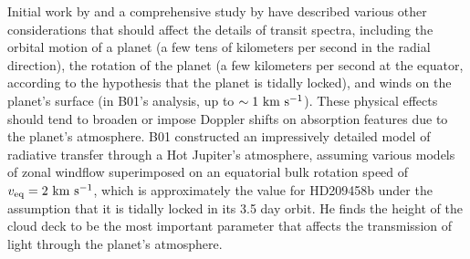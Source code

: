\documentclass[12pt,preprint]{aastex}
\begin{document}
Initial work by \citet{seager+sasselov2000} and a comprehensive study by
\citet[hereafter B01]{brown2001}
have described various other considerations that should affect the details of
transit spectra, including the orbital motion of a planet (a few tens of
kilometers per second in the radial
direction), the rotation of the planet (a few kilometers per second at the
equator, according to the hypothesis that the planet is tidally locked), and
winds on the planet's surface (in B01's analysis, up to
$\sim 1 {\rm~km~s^{-1}}$).  These physical effects should tend to broaden or
impose Doppler shifts on absorption features due to the planet's atmosphere.
B01 constructed an impressively detailed model of radiative transfer
through a Hot Jupiter's atmosphere, assuming various models of zonal windflow
superimposed on an equatorial bulk rotation speed of
$v_{\rm eq} = 2 {\rm~km~s^{-1}}$, which is approximately the value for
HD209458b under the assumption that it is tidally locked in its 3.5 day orbit.
He finds the height of the cloud deck to be the most important
parameter that affects the transmission of light through the planet's
atmosphere.
\end{document}
